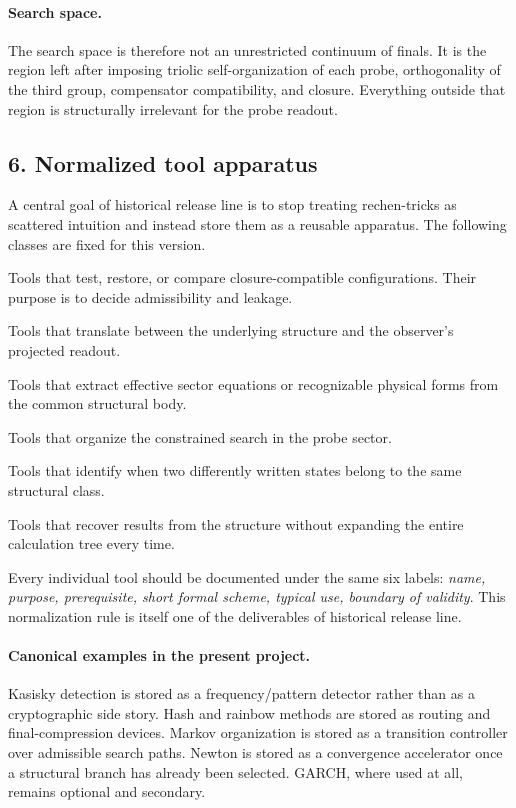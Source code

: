 \documentclass[12pt,a4paper]{article}
\DeclareRobustCommand{\QSCver}[1]{archival stage}
\renewcommand{\QSCver}[1]{historical release line}
\begin{document}
\paragraph{Search space.}
The search space is therefore not an unrestricted continuum of finals. It
is the region left after imposing triolic self-organization of each probe,
orthogonality of the third group, compensator compatibility, and closure.
Everything outside that region is structurally irrelevant for the probe readout.

\subsection*{6. Normalized tool apparatus}
A central goal of \QSCver{v1.2.0} is to stop treating rechen-tricks as scattered
intuition and instead store them as a reusable apparatus. The following classes
are fixed for this version.

\begin{description}[leftmargin=2.2em, style=nextline]
 \item[Closure-tools.] Tools that test, restore, or compare closure-compatible
 configurations. Their purpose is to decide admissibility and leakage.
 \item[Frame-shift-tools.] Tools that translate between the underlying
 structure and the observer's projected readout.
 \item[Projection-tools.] Tools that extract effective sector equations or
 recognizable physical forms from the common structural body.
 \item[Probe-tools.] Tools that organize the constrained search in the probe
 sector.
 \item[Equivalence-tools.] Tools that identify when two differently written
 states belong to the same structural class.
 \item[Read-off / trace-tools.] Tools that recover results from the structure
 without expanding the entire calculation tree every time.
\end{description}

Every individual tool should be documented under the same six labels:
\emph{name, purpose, prerequisite, short formal scheme, typical use, boundary
of validity}. This normalization rule is itself one of the deliverables of
\QSCver{v1.2.0}.

\paragraph{Canonical examples in the present project.}
Kasisky detection is stored as a frequency/pattern detector rather than as a
cryptographic side story. Hash and rainbow methods are stored as routing and
final-compression devices. Markov organization is stored as a transition
controller over admissible search paths. Newton is stored as a convergence
accelerator once a structural branch has already been selected. GARCH, where
used at all, remains optional and secondary.
\end{document}
